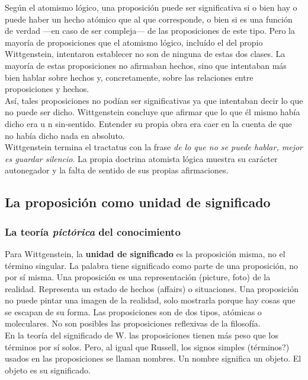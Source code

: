 \documentclass[a4paper, 11pt, twocolumn, spanish]{article}
\begin{document}
Según el atomismo lógico, una proposición puede ser significativa si o
bien hay o puede haber un hecho atómico que al que corresponde, o bien
si es una función de verdad —en caso de ser compleja— de las
proposiciones de este tipo. Pero la mayoría de proposiciones que el
atomismo lógico, incluído el del propio Wittgenstein, intentaron
establecer no son de ninguna de estas dos clases. La mayoría de estas
proposiciones no afirmaban hechos, sino que intentaban más bien hablar
sobre hechos y, concretamente, sobre las relaciones entre
proposiciones y hechos.\\

Así, tales proposiciones no podían ser significativas ya que
intentaban decir lo que no puede ser dicho. Wittgenstein concluye que
afirmar que lo que él mismo había dicho era u n sin-sentido. Entender
su propia obra era caer en la cuenta de que no había dicho nada en
absoluto.\\
Wittgenstein termina el tractatus con la frase \emph{de lo que no se puede
hablar, mejor es guardar silencio}. La propia doctrina atomista lógica
muestra su carácter autonegador y la falta de sentido de sus propias
afirmaciones.

\subsection{La proposición como unidad de significado}
\label{sec:orgcb363a7}
\subsubsection{La teoría \emph{pictórica} del conocimiento}
\label{sec:org4d57ed1}
Para Wittgenstein, la \textbf{unidad de significado} es la proposición misma,
no el término singular. La palabra tiene significado como parte de una
proposición, no por sí misma. Una proposición es una representación
(picture, foto) de la realidad. Representa un estado de hechos
(affairs) o situaciones. Una proposición no puede pintar una imagen de
la realidad, solo mostrarla porque hay cosas que se escapan de su
forma. Las proposiciones son de dos tipos, atómicas o moleculares. No
son posibles las proposiciones reflexivas de la filosofía.\\

En la teoría del significado de W. las proposiciones tienen más peso
que los términos por sí solos. Pero, al igual que Russell, los signos
simples (términos?) usados en las proposiciones se llaman nombres. Un
nombre significa un objeto. El objeto es su significado.\\
\end{document}
